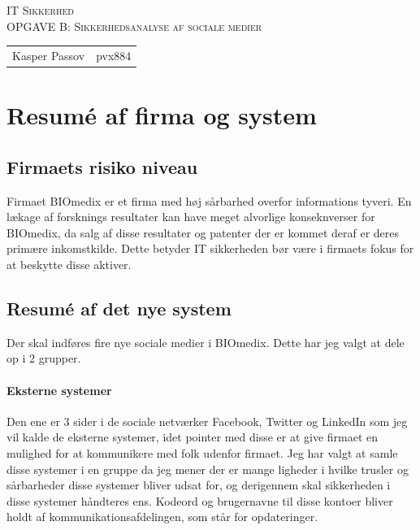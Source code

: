 \documentclass{article}
\begin{document}
\begin{titlepage}
\begin{center}
\textsc{\Large IT Sikkerhed}\\[0.5cm]
\textsc{OPGAVE B: Sikkerhedsanalyse af sociale medier}\\[0.5cm]
\vspace{2 cm}
\begin{tabular}{ll}
Kasper Passov & pvx884\\
\end{tabular}
\end{center}
\vspace{5 cm}
\newpage
\tableofcontents
\end{titlepage}

\section{Resumé af firma og system}
\subsection{Firmaets risiko niveau}
Firmaet BIOmedix er et firma med høj sårbarhed overfor informations tyveri. En lækage af forsknings resultater kan have meget alvorlige konseknverser for BIOmedix, da salg af disse resultater og patenter der er kommet deraf er deres primære inkomstkilde. Dette betyder IT sikkerheden bør være i firmaets fokus for at beskytte disse aktiver. 

\subsection{Resumé af det nye system}
Der skal indføres fire nye sociale medier i BIOmedix. Dette har jeg valgt at dele op i 2 grupper. 

\paragraph{Eksterne systemer}
Den ene er 3 sider i de sociale netværker Facebook, Twitter og LinkedIn som jeg vil kalde de eksterne systemer, idet pointer med disse er at give firmaet en mulighed for at kommunikere med folk udenfor firmaet. Jeg har valgt at samle disse systemer i en gruppe da jeg mener der er mange ligheder i hvilke trusler og sårbarheder disse systemer bliver udsat for, og derigennem skal sikkerheden i disse systemer håndteres ens. Kodeord og brugernavne til disse kontoer bliver holdt af kommunikationsafdelingen, som står for opdateringer.
\end{document}
